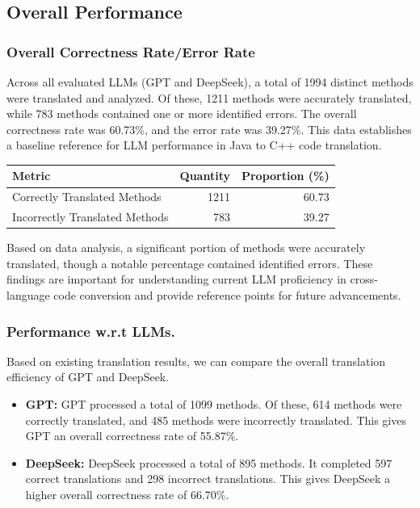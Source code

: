 \subsection{Overall Performance}
\subsubsection{Overall Correctness Rate/Error Rate}
Across all evaluated LLMs (GPT and DeepSeek), a total of 1994 distinct methods were translated and analyzed. Of these, 1211 methods were accurately translated, while 783 methods contained one or more identified errors. The overall correctness rate was 60.73\%, and the error rate was 39.27\%. This data establishes a baseline reference for LLM performance in Java to C++ code translation.

\begin{table}[H]
  \centering
  \label{tab:translation-stats}
  \begin{tabular}{lrr}
    \hline
    Metric                         & Quantity & Proportion (\%) \\
    \hline
    Correctly Translated Methods   & 1211     & 60.73           \\
    Incorrectly Translated Methods & 783     & 39.27           \\
    \hline
  \end{tabular}
\end{table}

Based on data analysis, a significant portion of methods were accurately translated, though a notable percentage contained identified errors. These findings are important for understanding current LLM proficiency in cross-language code conversion and provide reference points for future advancements.

\subsubsection{Performance w.r.t LLMs.}
Based on existing translation results, we can compare the overall translation efficiency of GPT and DeepSeek.
\begin{itemize}[leftmargin=1.5em]
    \item \textbf{GPT: }GPT processed a total of 1099 methods. Of these, 614 methods were correctly translated, and 485 methods were incorrectly translated. This gives GPT an overall correctness rate of 55.87\%.
    \item \textbf{DeepSeek: }DeepSeek processed a total of 895 methods. It completed 597 correct translations and 298 incorrect translations. This gives DeepSeek a higher overall correctness rate of 66.70\%.
\end{itemize}


